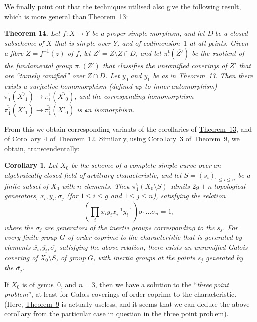 \documentclass{article}
\newenvironment{itenv}[1]
  {\phantomsection\par\medskip\noindent\textbf{#1.}\itshape}
  {\par\medskip}
\renewcommand{\leq}{\leqslant}
\newcommand{\oldpage}[1]{\marginpar{\footnotesize$\Big\vert$ \textit{p.~#1}}}
\begin{document}
We finally point out that the techniques utilised also give the following result, which is more general than \hyperref[theorem13]{Theorem~13}:

\begin{itenv}{Theorem 14}
\label{theorem14}
  Let $f\colon X\to Y$ be a proper simple morphism, and let $D$ be a closed subscheme of $X$ that is simple over $Y$, and of codimension~$1$ at all points.
  Given a fibre $Z=f^{-1}(z)$ of $f$, let $Z'=Z\setminus Z\cap D$, and let $\pi_1^\mathrm{t}(\overline{Z'})$ be the quotient of the fundamental group $\pi_1(Z')$ that classifies the unramified coverings of $\overline{Z'}$ that are ``tamely ramified'' over $\overline{Z\cap D}$.
  Let $y_0$ and $y_1$ be as in \hyperref[theorem13]{Theorem~13}.
  Then there exists a \emph{surjective} homomorphism (defined up to inner automorphism) $\pi_1^\mathrm{t}(\overline{X'_1})\to\pi_1^\mathrm{t}(\overline{X'_0})$, and the corresponding homomorphism $\overline{\pi_1^\mathrm{t}}(\overline{X'_1})\to\overline{\pi_1^\mathrm{t}}(\overline{X'_0})$ is an isomorphism.
\end{itenv}

From this we obtain corresponding variants of the corollaries of \hyperref[theorem13]{Theorem~13}, and of \hyperref[theorem12corollary4]{Corollary~4} of \hyperref[theorem12]{Theorem~12}.
Similarly, using \hyperref[theorem9corollary3]{Corollary~3} of \hyperref[theorem9]{Theorem~9}, we obtain, transcendentally:

\begin{itenv}{Corollary 1}
\label{theorem14corollary1}
  Let $X_0$ be the scheme of a complete simple curve over an algebraically closed field of arbitrary characteristic, and let $S=(s_i)_{1\leq i\leq n}$ be a finite subset of $X_0$ with $n$ elements.
  Then $\pi_1^\mathrm{t}(X_0\setminus S)$ admits $2g+n$ topological generators, $x_i,y_i,\sigma_j$ (for $1\leq i\leq g$ and $1\leq j\leq n$), satisfying the relation
  \[
    \left(\prod_i x_iy_ix_i^{-1}y_i^{-1}\right)\sigma_1\ldots\sigma_n = 1,
  \]
  where the $\sigma_j$ are generators of the inertia groups corresponding to the $s_j$.
  For every finite group $G$ \emph{of order coprime to the characteristic} that is generated by elements $\overline{x_i},\overline{y_i},\overline{\sigma_j}$ satisfying the above relation, there exists an unramified Galois covering of $X_0\setminus S$, of group $G$, with inertia groups at the points $s_j$ generated by the $\overline{\sigma_j}$.
\end{itenv}

If $X_0$ is of genus~$0$, and $n=3$, then we have a solution to the
\oldpage{182-28}
``\emph{three point problem}'', at least for Galois coverings of order coprime to the characteristic.
(Here, \hyperref[theorem9]{Theorem~9} is actually useless, and it seems that we can deduce the above corollary from the particular case in question in the three point problem).
\end{document}
